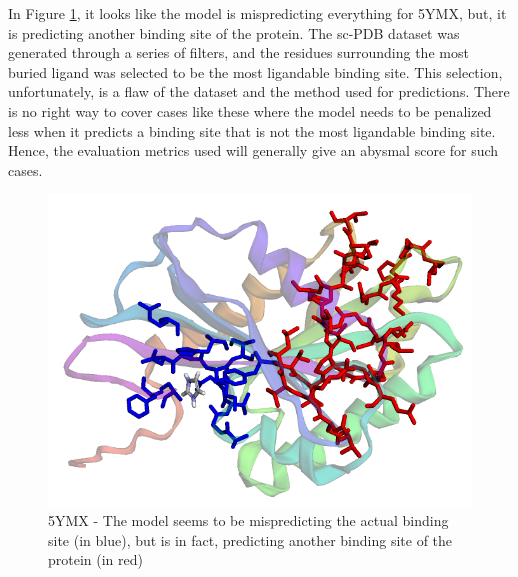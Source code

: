 \documentclass[journal=jacsat,manuscript=article]{achemso}
\begin{document}
In Figure \ref{fig:5ymx}, it looks like the model is mispredicting everything for 5YMX\cite{galicia2019mgla}, but, it is predicting another binding site of the protein. The sc-PDB\cite{desaphy2015sc} dataset was generated through a series of filters, and the residues surrounding the most buried ligand was selected to be the most ligandable binding site. This selection, unfortunately, is a flaw of the dataset and the method used for predictions. There is no right way to cover cases like these where the model needs to be penalized less when it predicts a binding site that is not the most ligandable binding site. Hence, the evaluation metrics used will generally give an abysmal score for such cases.
\begin{figure}
    \centering
    \noindent\includegraphics[scale=0.4]{5ymx.png}
    \caption{\centering 5YMX - The model seems to be mispredicting the actual binding site (in blue), but is in fact, predicting another binding site of the protein (in red)}
    \label{fig:5ymx}
\end{figure}
\end{document}
